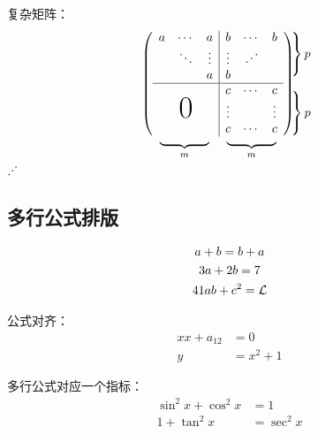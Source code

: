 \documentclass[10pt]{ctexart}%
\newcommand{\adots}{\mkern2mu\raisebox{0.1em}{.}\mkern2mu\raisebox{0.4em}{.}\mkern2mu\raisebox{0.7em}{.}\mkern1mu}%
\begin{document}
	复杂矩阵：
	\[
	\begin{array}{c@{\hspace{-3mm}}l}%
	   \left(
	   \begin{array}{ccc|ccc}
	      a&\cdots&a&b&\cdots&b\\
	      &\ddots&\vdots&\vdots&\adots&\\
	      &&a&b&&\\
	      \hline
	      &&&c&\cdots&c\\
	      \multicolumn{3}{c|}{\raisebox{0em}{\Huge 0}}&\vdots&&\vdots\\%
	      &&&c&\cdots&c
	   \end{array}
	   \right)
	   &
	   \begin{array}{l}
	   \left.\rule{0mm}{2em}\right\}p\\
	   \\
	   \left.\rule{0mm}{2em}\right\}p
	   \end{array}
	   \\[-5pt]%
	   \begin{array}{c@{\hspace{5mm}}c}
	   \underbrace{\rule{4em}{0mm}}_m&%
	   \underbrace{\rule{4em}{0mm}}_m
	   \end{array}
	   &
	\end{array}
	\]
	$
	\raisebox{0.1em}{.}\raisebox{0.4em}{.}\raisebox{0.7em}{.}
	$
	\subsection{多行公式排版}
	\begin{gather}%
		a+b=b+a\\
		3a+2b=7\\
		41ab+c^2=\mathcal{L} \notag%
	\end{gather}
	
	公式对齐：
	\begin{align}%
		xx+a_{12}&=0\\
		y&=x^2+1
	\end{align}
	
	多行公式对应一个指标：
	\begin{equation}
		\begin{split}
		\sin^2x +\cos^2x &=1\\
		1+\tan^2x &=\sec^2x
		\end{split}
	\end{equation}
	
\end{document}
